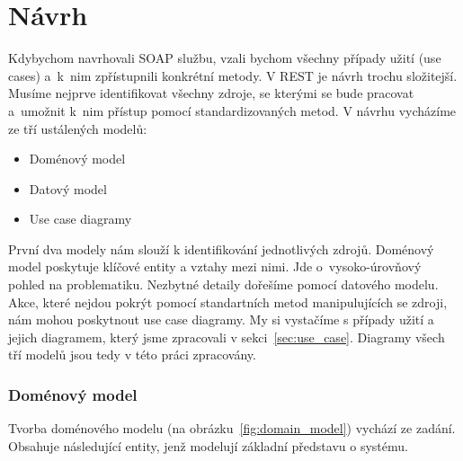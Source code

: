 \chapter{Návrh}

Kdybychom navrhovali SOAP službu, vzali bychom všechny případy užití (use cases) a~k~nim zpřístupnili
konkrétní metody. V REST je návrh trochu složitejší.
Musíme nejprve identifikovat všechny zdroje, se kterými se bude pracovat a~umožnit
k~nim přístup pomocí standardizovaných metod. V návrhu vycházíme ze tří ustálených modelů:

\begin{itemize}
\item Doménový model
\item Datový model
\item Use case diagramy
\end{itemize}

První dva modely nám slouží k identifikování jednotlivých zdrojů.
Doménový model poskytuje klíčové entity a vztahy mezi nimi.
Jde o~vysoko-úrovňový pohled na problematiku. Nezbytné detaily dořešíme pomocí datového modelu. 
Akce, které nejdou pokrýt pomocí standartních metod manipulujících se zdroji, nám mohou poskytnout use case diagramy.
My si vystačíme s případy užití a jejich diagramem, který jsme zpracovali v sekci~\ref{sec:use_case}. 
Diagramy všech tří modelů jsou tedy v této práci zpracovány.

\subsection{Doménový model}

Tvorba doménového modelu (na obrázku~\ref{fig:domain_model}) vychází ze zadání. Obsahuje následující entity,
jenž modelují základní představu o systému.

